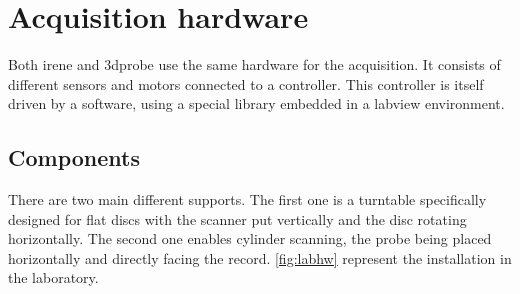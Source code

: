 \section{Acquisition hardware}

Both \gls{irene} and \gls{3dprobe} use the same hardware for the acquisition. It consists of different sensors and motors connected to a controller. This controller is itself driven by a software, using a special library embedded in a \gls{labview} environment.

\subsection{Components}

There are two main different supports. The first one is a turntable specifically designed for flat discs with the scanner put vertically and the disc rotating horizontally. The second one enables cylinder scanning, the probe being placed horizontally and directly facing the record. \autoref{fig:labhw} represent the installation in the laboratory.

